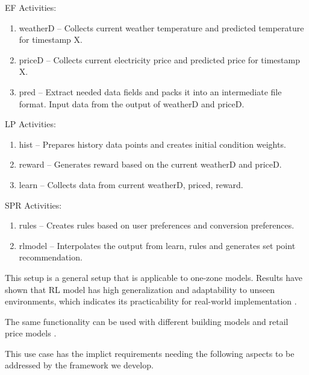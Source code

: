EF Activities:

\begin{enumerate}
\item weatherD -- Collects current weather temperature and predicted temperature for timestamp X.
\item priceD -- Collects current electricity price and predicted price for timestamp X.
\item pred -- Extract needed data fields and packs it into an intermediate file format. Input data from the output of weatherD and priceD.
\end{enumerate}


LP Activities:

\begin{enumerate}
\item hist -- Prepares history data points and creates initial condition weights.
\item reward -- Generates reward based on the current weatherD and priceD.
\item learn -- Collects data from current weatherD, priced, reward.
\end{enumerate}

SPR Activities:

\begin{enumerate}
\item rules -- Creates rules based on user preferences and conversion preferences.
\item rlmodel --  Interpolates the output from learn, rules and generates set point recommendation.
\end{enumerate}

This setup is a general setup that is applicable to one-zone models. Results have shown that RL model has high generalization and adaptability to unseen environments, which indicates its practicability for real-world implementation \cite{du2021intelligent}.

The same functionality can be used with different building models and retail price models \cite{du2021intelligent}. 





This use case has the implict requirements needing the following
aspects to be addressed by the framework we develop.


